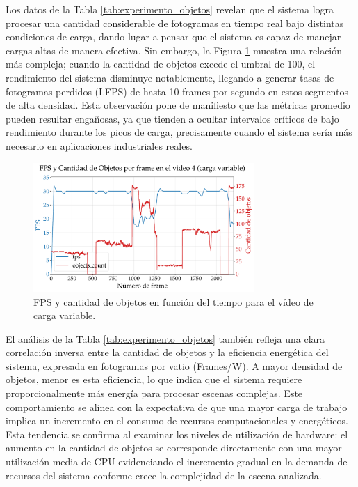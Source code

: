 \documentclass[11pt,spanish,listoffigures,listoftables]{tfgetsinf}
\begin{document}
Los datos de la Tabla \ref{tab:experimento_objetos} revelan que el sistema logra procesar una cantidad considerable de fotogramas en tiempo real bajo distintas condiciones de carga, dando lugar a pensar que el sistema es capaz de manejar cargas altas de manera efectiva. Sin embargo, la Figura \ref{fig:fps_vs_object_count} muestra una relación más compleja; cuando la cantidad de objetos excede el umbral de 100, el rendimiento del sistema disminuye notablemente, llegando a generar tasas de fotogramas perdidos (LFPS) de hasta 10 frames por segundo en estos segmentos de alta densidad. Esta observación pone de manifiesto que las métricas promedio pueden resultar engañosas, ya que tienden a ocultar intervalos críticos de bajo rendimiento durante los picos de carga, precisamente cuando el sistema sería más necesario en aplicaciones industriales reales.

\begin{figure}[H]
   \centering
   \includegraphics[width=0.75\textwidth]{excels/inferencia/cantidad_objetos/resultados/variable_fps_vs_object_count/fps_vs_object_count.pdf}
   \caption[FPS y cantidad de objetos en función del tiempo para el vídeo de carga variable]{FPS y cantidad de objetos en función del tiempo para el vídeo de carga variable.}
   \label{fig:fps_vs_object_count}
\end{figure}

El análisis de la Tabla \ref{tab:experimento_objetos} también refleja una clara correlación inversa entre la cantidad de objetos y la eficiencia energética del sistema, expresada en fotogramas por vatio (Frames/W). A mayor densidad de objetos, menor es esta eficiencia, lo que indica que el sistema requiere proporcionalmente más energía para procesar escenas complejas. Este comportamiento se alinea con la expectativa de que una mayor carga de trabajo implica un incremento en el consumo de recursos computacionales y energéticos. Esta tendencia se confirma al examinar los niveles de utilización de hardware: el aumento en la cantidad de objetos se corresponde directamente con una mayor utilización media de CPU evidenciando el incremento gradual en la demanda de recursos del sistema conforme crece la complejidad de la escena analizada.
\end{document}
